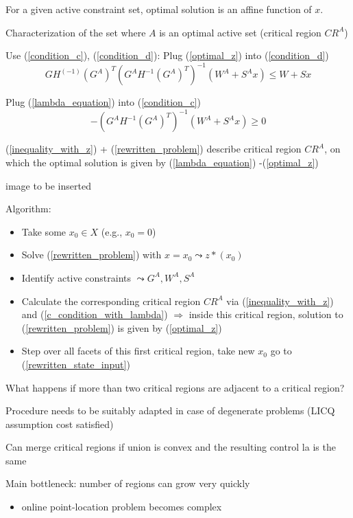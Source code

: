 For a given active constraint set, optimal solution is an affine function of $x$.

Characterization of the set where $A$ is an optimal active set (critical region $CR^A$)

Use (\ref{condition_c}), (\ref{condition_d}): Plug (\ref{optimal_z}) into (\ref{condition_d})
\begin{equation}\label{inequality_with_z}
GH^(-1)(G^A)^T(G^AH^{-1}(G^A)^T)^{-1}(W^A+S^Ax) \leq W + Sx
\end{equation}

Plug (\ref{lambda_equation}) into (\ref{condition_c})
\begin{equation}\label{c_condition_with_lambda}
-(G^AH^{-1}(G^A)^T)^{-1}(W^A+S^Ax) \geq 0
\end{equation}

(\ref{inequality_with_z}) + (\ref{rewritten_problem}) describe critical region $CR^A$, on which the optimal solution is given by (\ref{lambda_equation}) -(\ref{optimal_z})

image to be inserted

Algorithm:
\begin{itemize}
\item Take some $x_0 \in X$ (e.g., $x_0 = 0$)
\item Solve (\ref{rewritten_problem}) with $x = x_0 \leadsto z*(x_0)$
\item Identify active constraints $\leadsto G^A, W^A, S^A$
\item Calculate the corresponding critical region $CR^A$ via (\ref{inequality_with_z}) and (\ref{c_condition_with_lambda})
$\Rightarrow$ inside this critical region, solution to (\ref{rewritten_problem}) is given by (\ref{optimal_z})
\item Step over all facets of this first critical region, take new $x_0$ go to (\ref{rewritten_state_input})
\end{itemize}  

What happens if more than two critical regions are adjacent to a critical region?

Procedure needs to be suitably adapted in case of degenerate problems (LICQ assumption cost satisfied)

Can merge critical regions if union is convex and the resulting control la is the same

Main bottleneck: number of regions can grow very quickly
\begin{itemize}
\item online point-location problem becomes complex
\end{itemize}

